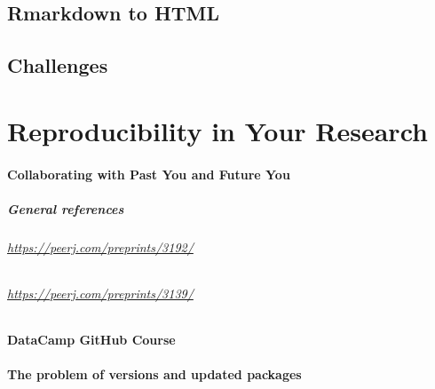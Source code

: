 \documentclass[
]{book}
\begin{document}
\hypertarget{rmarkdown-to-html}{%
\section{Rmarkdown to HTML}\label{rmarkdown-to-html}}

\hypertarget{challenges-2}{%
\section{Challenges}\label{challenges-2}}

\hypertarget{reproducibility-in-your-research}{%
\chapter{Reproducibility in Your Research}\label{reproducibility-in-your-research}}

\hypertarget{collaborating-with-past-you-and-future-you}{%
\subsubsection{Collaborating with Past You and Future You}\label{collaborating-with-past-you-and-future-you}}

\hypertarget{general-references}{%
\paragraph{General references}\label{general-references}}

\hypertarget{httpspeerj.compreprints3192}{%
\subparagraph{\texorpdfstring{\url{https://peerj.com/preprints/3192/}}{https://peerj.com/preprints/3192/}}\label{httpspeerj.compreprints3192}}

\hypertarget{httpspeerj.compreprints3139}{%
\subparagraph{\texorpdfstring{\url{https://peerj.com/preprints/3139/}}{https://peerj.com/preprints/3139/}}\label{httpspeerj.compreprints3139}}

\hypertarget{datacamp-github-course}{%
\subsubsection{DataCamp GitHub Course}\label{datacamp-github-course}}

\hypertarget{the-problem-of-versions-and-updated-packages}{%
\subsubsection{The problem of versions and updated packages}\label{the-problem-of-versions-and-updated-packages}}
\end{document}

